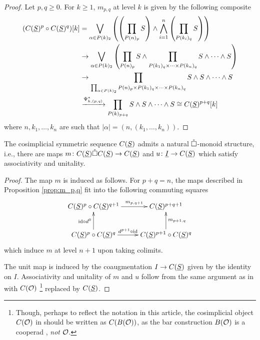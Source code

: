 \begin{proof}
    Let $p,q\geq 0$. For $k\geq 1$, $m_{p,q}$ at level $k$ is given by the following composite
     \begin{align*}
        ( C(\underline{S})^p \circ C(\underline{S})^q)[k] & 
        = \bigvee_{\alpha\in P(k)_2} \left( \left( \prod_{P(n)_p} S\right) \wedge \bigwedge_{i=1}^{n} \left(\prod_{P(k_i)_q} S\right) \right)\\ 
        & \to \bigvee_{\alpha \in P(k)_2} \left( \prod_{P(n)_p} S  \wedge \prod_{P(k_1)_q \times \cdots \times P(k_n)_q}  S\wedge\cdots \wedge S \right)\\
        & \to \prod_{\prod_{\alpha\in P(k)_2} P(n)_p \times P(k_1)_q \times \cdots \times P(k_n)_q} S\wedge S\wedge \cdots \wedge S\\
        & \xrightarrow{\Psi_{k,(p,q)}^*} \prod_{P(k)_{p+q}} S\wedge S \wedge \cdots \wedge S\cong C(\underline{S})^{p+q}[k]
    \end{align*}
    where $n,k_1,\dots,k_n$ are such that $ |\alpha|=(n,(k_1,\dots,k_n))$. 
\end{proof}

\begin{proposition}
    \label{def:box-circ-prod-map-top}
    The cosimplicial symmetric sequence $C(\underline{S})$ admits a natural $\mathring{\square}$-monoid structure, i.e., there are maps $m\colon C(\underline{S})\mathring{\square} C(\underline{S})\to C(\underline{S})$ and $u \colon \underline{I}\to C(\underline{S})$ which satisfy associativity and unitality. 
\end{proposition}

\begin{proof}
    The map $m$ is induced as follows. For $p+q=n$, the maps described in Proposition \ref{prop:m_p,q} fit into the following commuting squares \[ \xymatrix{ 
        C(\uS)^p \circ C(\uS)^{q+1} \ar[r]^-{m_{p,q+1}}
        &
        C(\uS)^{p+q+1}
        \\
        C(\uS)^p\circ C(\uS)^{q} \ar[u]^-{\id \circ d^0} \ar[r]^-{d^{p+1} \circ \id}
        &
        C(\uS)^{p+1} \circ C(\uS)^{q} \ar[u]_-{m_{p+1,q}}
    }\]
    which induce $m$ at level $n+1$ upon taking colimits. 
    
    The unit map is induced by the coaugmentation $I\to C(\underline{S})$ given by the identity on $I$. Associativity and unitality of $m$ and $u$ follow from the same argument as in \cite[Proposition 5.8]{Clark-1} with $C(\mathcal{O})$ \footnote{Though, perhaps to reflect the notation in this article, the cosimplicial object $C(\mathcal{O})$ in \cite{Clark-1} should be written as $C(B(\mathcal{O}))$, as the bar construction $B(\mathcal{O})$ is a cooperad \cite{Ching-thesis}, \textit{not} $\mathcal{O}$.} replaced by $C(\underline{S})$.
\end{proof}


